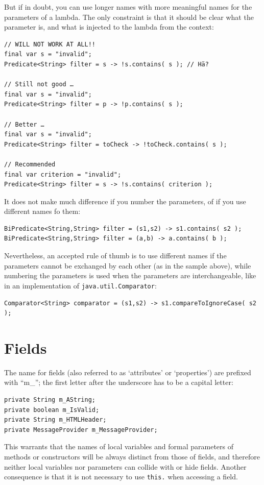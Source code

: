 \documentclass[11pt,a4paper, titlepage, parskip=half, headsepline, footsepline, cleardoublepage=current, headheight=1cm]{scrbook}
\begin{document}
But if in doubt, you can use longer names with more meaningful names for the parameters of a lambda. The only constraint is that it should be clear what the parameter is, and what is injected to the lambda from the context:
\begin{lstlisting}
// WILL NOT WORK AT ALL!!
final var s = "invalid";
Predicate<String> filter = s -> !s.contains( s ); // Hä?

// Still not good …
final var s = "invalid";
Predicate<String> filter = p -> !p.contains( s );

// Better …
final var s = "invalid";
Predicate<String> filter = toCheck -> !toCheck.contains( s );

// Recommended
final var criterion = "invalid";
Predicate<String> filter = s -> !s.contains( criterion );
\end{lstlisting}

It does not make much difference if you number the parameters, of if you use different names fo them:
\begin{lstlisting}
BiPredicate<String,String> filter = (s1,s2) -> s1.contains( s2 );
BiPredicate<String,String> filter = (a,b) -> a.contains( b );
\end{lstlisting}

Nevertheless, an accepted rule of thumb is to use different names if the parameters cannot be exchanged by each other (as in the sample above), while numbering the parameters is used when the parameters are interchangeable, like in an implementation of \lstinline|java.util.Comparator|:
\begin{lstlisting}
Comparator<String> comparator = (s1,s2) -> s1.compareToIgnoreCase( s2 );
\end{lstlisting}

\section{Fields}\label{sec:Fields}
The name for fields (also referred to as ‘attributes’ or ‘properties’) are prefixed with “m\_”; the first letter after the underscore has to be a capital letter:
\begin{lstlisting}
private String m_AString;
private boolean m_IsValid;
private String m_HTMLHeader;
private MessageProvider m_MessageProvider;
\end{lstlisting}
This warrants that the names of local variables and formal parameters of methods or constructors will be always distinct from those of fields, and therefore neither local variables nor parameters can collide with or hide fields. Another consequence is that it is not necessary to use \lstinline|this.| when accessing a field.
\end{document}
